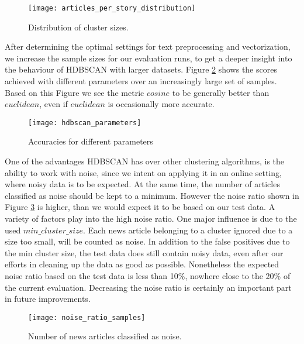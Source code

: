 \begin{figure}[h]
    \centering
    \texttt{[image: articles\_per\_story\_distribution]}
    \caption{Distribution of cluster sizes.}
    \label{fig:articles_per_story_distribution}
\end{figure}

After determining the optimal settings for text preprocessing and vectorization, we increase the sample sizes for our evaluation runs, to get a deeper insight into the behaviour of HDBSCAN with larger datasets. Figure \ref{fig:hdbscan_parameters} shows the scores achieved with different parameters over an increasingly large set of samples. Based on this Figure we see the metric $cosine$ to be generally better than $euclidean$, even if $euclidean$ is occasionally more accurate.


\begin{figure}[h]
    \centering
    \texttt{[image: hdbscan\_parameters]}
    \caption{Accuracies for different parameters}
    \label{fig:hdbscan_parameters}
\end{figure}

One of the advantages HDBSCAN has over other clustering algorithms, is the ability to work with noise, since we intent on applying it in an online setting, where noisy data is to be expected. At the same time, the number of articles classified as noise should be kept to a minimum. However the noise ratio shown in Figure \ref{fig:noise_ratio_samples} is higher, than we would expect it to be based on our test data. A variety of factors play into the high noise ratio. One major influence is due to the used $min\_cluster\_size$. Each news article belonging to a cluster ignored due to a size too small, will be counted as noise. In addition to the false positives due to the min cluster size, the test data does still contain noisy data, even after our efforts in cleaning up the data as good as possible. Nonetheless the expected noise ratio based on the test data is less than 10\%, nowhere close to the 20\% of the current evaluation. Decreasing the noise ratio is certainly an important part in future improvements.



\begin{figure}[h]
    \centering
    \texttt{[image: noise\_ratio\_samples]}
    \caption{Number of news articles classified as noise.}
    \label{fig:noise_ratio_samples}
\end{figure}


